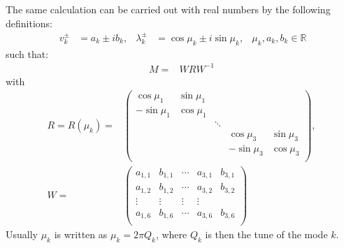 \documentclass[english]{article}
\begin{document}
The same calculation can be carried out with real numbers by the following definitions:
\begin{align}\
v_k^\pm &= a_k\pm ib_k, & \lambda_k^\pm &= \cos \mu_k \pm i \sin \mu_k, &
\mu_k, a_k, b_k \in \mathbb{R}
\end{align}
such that:
\begin{align}\label{opt:eqn:1:1}
M=&W R W^{-1}
\end{align}
with
\begin{align}
R=R(\mu_k)=&\left(
\begin{array}{ccccc}
\cos \mu_1 & \sin \mu_1  &  & &\\
-\sin \mu_1 & \cos \mu_1 &  & &\\
&    & \ddots & &\\
& & & \cos \mu_3 & \sin \mu_3 \\
& & & -\sin \mu_3 & \cos \mu_3 \\
\end{array}
\right), \\
W=&\left(
\begin{array}{ccccc}
a_{1,1} & b_{1,1} & \cdots & a_{3,1} & b_{3,1} \\
a_{1,2} & b_{1,2} & \cdots & a_{3,2} & b_{3,2} \\
\vdots    & \vdots    & \vdots & \vdots\\
a_{1,6} & b_{1,6} & \cdots & a_{3,6} & b_{3,6} \\
\end{array}
\right)
\end{align}
Usually $\mu_k$ is written as $\mu_k=2\pi Q_k$, where $Q_k$ is then the tune of the mode $k$.
\end{document}
